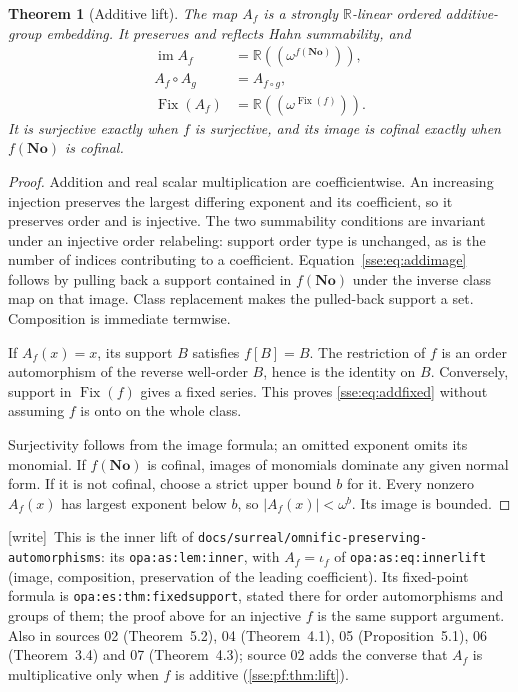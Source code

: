 \documentclass[11pt,a4paper]{article}
\numberwithin{equation}{section}
\theoremstyle{plain}
\newtheorem{theorem}{Theorem}[section]
\theoremstyle{definition}
\theoremstyle{remark}
\newcommand{\No}{\mathbf{No}}
\newcommand{\R}{\mathbb{R}}
\newcommand{\Fix}{\operatorname{Fix}}
\newcommand{\im}{\operatorname{im}}
\newcommand{\NF}[1]{\R((\omega^{#1}))}
\newcommand{\lbl}[1]{\nolinkurl{#1}}%
\newcommand{\fn}[1]{\nolinkurl{#1}}%
\newcommand{\wtag}{\textup{\textsf{[write]}}}%
\newenvironment{wnote}{\par\smallskip\noindent\wtag\ }{\par\smallskip}
\begin{document}
\begin{theorem}[Additive lift]\label{sse:thm:addlift}
The map $A_f$ is a strongly $\R$-linear ordered additive-group embedding.
It preserves and reflects Hahn summability, and
\begin{align}
 \im A_f&=\NF{f(\No)},\label{sse:eq:addimage}\\
 A_f\circ A_g&=A_{f\circ g},\label{sse:eq:addfunctor}\\
 \Fix(A_f)&=\NF{\Fix(f)}.\label{sse:eq:addfixed}
\end{align}
It is surjective exactly when $f$ is surjective, and its image is cofinal
exactly when $f(\No)$ is cofinal.
\end{theorem}
\begin{proof}
Addition and real scalar multiplication are coefficientwise. An increasing
injection preserves the largest differing exponent and its coefficient,
so it preserves order and is injective. The two summability conditions are
invariant under an injective order relabeling: support order type is
unchanged, as is the number of indices contributing to a coefficient.
Equation~\eqref{sse:eq:addimage} follows by pulling back a support contained in
$f(\No)$ under the inverse class map on that image. Class replacement
makes the pulled-back support a set. Composition is immediate termwise.

If $A_f(x)=x$, its support $B$ satisfies $f[B]=B$. The restriction of $f$ is
an order automorphism of the reverse well-order $B$, hence is the identity
on $B$. Conversely, support in $\Fix(f)$ gives a fixed series. This proves
\eqref{sse:eq:addfixed} without assuming $f$ is onto on the whole class.

Surjectivity follows from the image formula; an omitted exponent omits its
monomial. If $f(\No)$ is cofinal, images of monomials dominate any given
normal form. If it is not cofinal, choose a strict upper bound $b$ for it.
Every nonzero $A_f(x)$ has largest exponent below $b$, so
$|A_f(x)|<\omega^b$. Its image is bounded.
\end{proof}
\begin{wnote}This is the inner lift of \fn{docs/surreal/omnific-preserving-automorphisms}: its \lbl{opa:as:lem:inner}, with $A_f=\iota_f$ of \lbl{opa:as:eq:innerlift} (image, composition, preservation of the leading coefficient). Its fixed-point formula is \lbl{opa:es:thm:fixedsupport}, stated there for order automorphisms and groups of them; the proof above for an injective $f$ is the same support argument. Also in sources 02 (Theorem~5.2), 04 (Theorem~4.1), 05 (Proposition~5.1), 06 (Theorem~3.4) and 07 (Theorem~4.3); source 02 adds the converse that $A_f$ is multiplicative only when $f$ is additive (\cref{sse:pf:thm:lift}).\end{wnote}
\end{document}
